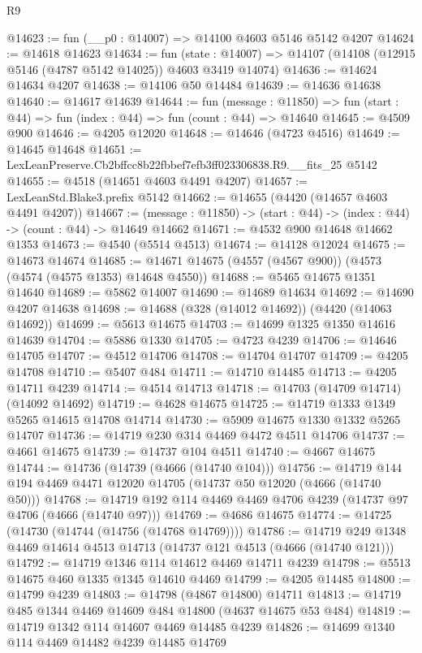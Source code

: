 \begin{lexlean}{R9}
\begin{coremodule}
@14623 := fun (__p0 : @14007) => @14100 @4603 @5146 @5142 @4207
@14624 := @14618 @14623
@14634 := fun (state : @14007) =>
  @14107 (@14108 (@12915 @5146 (@4787 @5142 @14025)) @4603 @3419 @14074)
@14636 := @14624 @14634 @4207
@14638 := @14106 @50 @14484
@14639 := @14636 @14638
@14640 := @14617 @14639
@14644 := fun (message : @11850) =>
  fun (start : @44) => fun (index : @44) => fun (count : @44) => @14640
@14645 := @4509 @900
@14646 := @4205 @12020
@14648 := @14646 (@4723 @4516)
@14649 := @14645 @14648
@14651 := LexLeanPreserve.Cb2bffcc8b22fbbef7efb3ff023306838.R9.__fits_25 @5142
@14655 := @4518 (@14651 @4603 @4491 @4207)
@14657 := LexLeanStd.Blake3.prefix @5142
@14662 := @14655 (@4420 (@14657 @4603 @4491 @4207))
@14667 := (message : @11850) -> (start : @44) -> (index : @44) -> (count : @44) -> @14649 @14662
@14671 := @4532 @900 @14648 @14662 @1353
@14673 := @4540 (@5514 @4513)
@14674 := @14128 @12024
@14675 := @14673 @14674
@14685 := @14671 @14675 (@4557 (@4567 @900)) (@4573 (@4574 (@4575 @1353) @14648 @4550))
@14688 := @5465 @14675 @1351 @14640
@14689 := @5862 @14007
@14690 := @14689 @14634
@14692 := @14690 @4207 @14638
@14698 := @14688 (@328 (@14012 @14692)) (@4420 (@14063 @14692))
@14699 := @5613 @14675
@14703 := @14699 @1325 @1350 @14616 @14639
@14704 := @5886 @1330
@14705 := @4723 @4239
@14706 := @14646 @14705
@14707 := @4512 @14706
@14708 := @14704 @14707
@14709 := @4205 @14708
@14710 := @5407 @484
@14711 := @14710 @14485
@14713 := @4205 @14711 @4239
@14714 := @4514 @14713
@14718 := @14703 (@14709 @14714) (@14092 @14692)
@14719 := @4628 @14675
@14725 := @14719 @1333 @1349 @5265 @14615 @14708 @14714
@14730 := @5909 @14675 @1330 @1332 @5265 @14707
@14736 := @14719 @230 @314 @4469 @4472 @4511 @14706
@14737 := @4661 @14675
@14739 := @14737 @104 @4511
@14740 := @4667 @14675
@14744 := @14736 (@14739 (@4666 (@14740 @104)))
@14756 := @14719 @144 @194 @4469 @4471 @12020 @14705 (@14737 @50 @12020 (@4666 (@14740 @50)))
@14768 := @14719 @192 @114 @4469 @4469 @4706 @4239 (@14737 @97 @4706 (@4666 (@14740 @97)))
@14769 := @4686 @14675
@14774 := @14725 (@14730 (@14744 (@14756 (@14768 @14769))))
@14786 := @14719 @249 @1348 @4469 @14614 @4513 @14713 (@14737 @121 @4513 (@4666 (@14740 @121)))
@14792 := @14719 @1346 @114 @14612 @4469 @14711 @4239
@14798 := @5513 @14675 @460 @1335 @1345 @14610 @4469
@14799 := @4205 @14485
@14800 := @14799 @4239
@14803 := @14798 (@4867 @14800) @14711
@14813 := @14719 @485 @1344 @4469 @14609 @484 @14800 (@4637 @14675 @53 @484)
@14819 := @14719 @1342 @114 @14607 @4469 @14485 @4239
@14826 := @14699 @1340 @114 @4469 @14482 @4239 @14485 @14769

\end{coremodule}
\end{lexlean}
